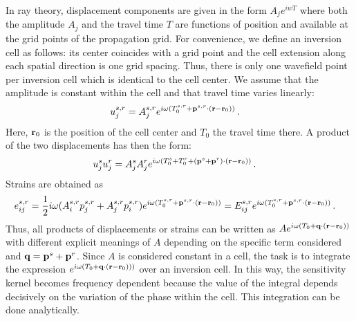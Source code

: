 In ray theory, displacement components are given in the form $A_j e^{iwT}$ where both the amplitude $A_j$ and the travel time $T$ are functions of position and available at the grid points of the propagation grid. For convenience, we define an inversion cell as follows: its center coincides with a grid point and the cell extension along each spatial direction is one grid spacing. Thus, there is only one wavefield point per inversion cell which is identical to the cell center. We assume that the amplitude is constant within the cell and that travel time varies linearly:
%
\begin{align}
   u^{s,r}_j &= A^{s,r}_j e^{i\omega (T^{s,r}_0+\textbf p^{s,r}\cdot(\textbf r-\textbf r_0))} \,.
\end{align}
%
Here, $\textbf r_0$ is the position of the cell center and $T_0$ the travel time there. A product of the two displacements has then the form:
%
\begin{align}
   u^s_j u^r_j &= A^s_j A^r_j e^{i\omega (T^s_0+T^r_0+(\textbf p^s+\textbf p^r)\cdot(\textbf r-\textbf r_0))} \,.
\end{align}
%
Strains are obtained as
%
\begin{align}
   e^{s,r}_{ij} &= \frac{1}{2}i\omega(A^{s,r}_i p^{s,r}_j + A^{s,r}_j p^{s,r}_i) e^{i\omega (T^{s,r}_0+\textbf p^{s,r}\cdot(\textbf r-\textbf r_0))} =
             E^{s,r}_{ij} e^{i\omega (T^{s,r}_0+\textbf p^{s,r}\cdot(\textbf r-\textbf r_0))} \,.
\end{align}
%
Thus, all products of displacements or strains can be written as $Ae^{i\omega(T_0+\textbf q\cdot(\textbf r-\textbf r_0))}$ with different explicit meanings of $A$ depending on the specific term considered and $\textbf q=\textbf p^s+\textbf p^r$. Since $A$ is considered constant in a cell, the task is to integrate the expression $e^{i\omega(T_0+\textbf q\cdot(\textbf r-\textbf r_0)))}$ over an inversion cell. In this way, the sensitivity kernel becomes frequency dependent because the value of the integral depends decisively on the variation of the phase within the cell. This integration can be done analytically.

